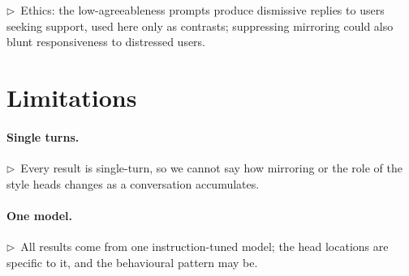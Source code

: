 \documentclass[11pt]{article}
\newcommand{\flow}[1]{\par\noindent\textcolor{blue!60!black}{\small$\triangleright$\ #1}\par\medskip}
\begin{document}
\flow{Ethics: the low-agreeableness prompts produce dismissive replies to users seeking support, used here only as contrasts; suppressing mirroring could also blunt responsiveness to distressed users.}

\section{Limitations}

\paragraph{Single turns.}
\flow{Every result is single-turn, so we cannot say how mirroring or the role of the style heads changes as a conversation accumulates.}

\paragraph{One model.}
\flow{All results come from one instruction-tuned model; the head locations are specific to it, and the behavioural pattern may be.}
\end{document}
